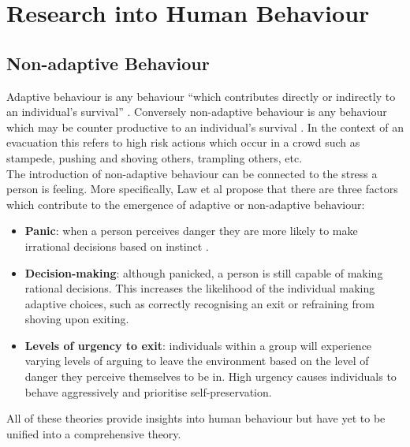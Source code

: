 %

\section{Research into Human Behaviour}
\label{Res:sec:humanBehaviour}
\subsection{Non-adaptive Behaviour}
\label{Res:subsec:nonadaptive}
Adaptive behaviour is any behaviour ``which contributes directly or indirectly to an individual's survival'' \cite{AdaptiveBehaviourWiki}.
Conversely non-adaptive behaviour is any behaviour which may be counter productive to an individual's survival \cite{AdaptiveBehaviourWiki}.
In the context of an evacuation this refers to high risk actions which occur in a crowd such as stampede, pushing and shoving others,
trampling others, etc.\\
The introduction of non-adaptive behaviour can be connected to the stress a person is feeling. More specifically, Law et al \cite{CIFEResearchProposal} propose that there are three factors which contribute to the emergence of adaptive or non-adaptive behaviour:
\begin{itemize}
  \item{\textbf{Panic}: when a person perceives danger they are more likely to make irrational decisions based on instinct \cite{PanMASSEgressThesis}.}
  \item{\textbf{Decision-making}: although panicked, a person is still capable of making rational decisions. This increases the likelihood of the individual making adaptive choices, such as correctly recognising an exit or refraining from shoving upon exiting.}
  \item{\textbf{Levels of urgency to exit}: individuals within a group will experience varying levels of arguing to leave the environment based on the level of danger they perceive themselves to be in. High urgency causes individuals to behave aggressively and prioritise self-preservation.}
\end{itemize}
All of these theories provide insights into human behaviour but have yet to be unified into a comprehensive theory.

